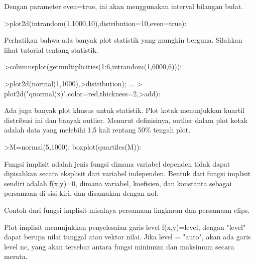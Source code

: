 \documentclass[a4paper,10pt]{article}
\begin{document}
\begin{eulernotebook}
\begin{eulercomment}
\begin{eulercomment}
\begin{eulercomment}
\begin{eulercomment}
\begin{eulercomment}
\begin{eulercomment}
\begin{eulercomment}
\begin{eulercomment}
\begin{eulerprompt}
\end{eulerprompt}
\begin{eulercomment}
Dengan parameter even=true, ini akan menggunakan interval bilangan
bulat.
\end{eulercomment}
\begin{eulerprompt}
>plot2d(intrandom(1,1000,10),distribution=10,even=true):
\end{eulerprompt}
\begin{eulercomment}
Perhatikan bahwa ada banyak plot statistik yang mungkin berguna.
Silahkan lihat tutorial tentang statistik.
\end{eulercomment}
\begin{eulerprompt}
>columnsplot(getmultiplicities(1:6,intrandom(1,6000,6))):
\end{eulerprompt}
\begin{eulerprompt}
>plot2d(normal(1,1000),>distribution); ...
>  plot2d("qnormal(x)",color=red,thickness=2,>add):
\end{eulerprompt}
\begin{eulercomment}
Ada juga banyak plot khusus untuk statistik. Plot kotak menunjukkan
kuartil distribusi ini dan banyak outlier. Menurut definisinya,
outlier dalam plot kotak adalah data yang melebihi 1,5 kali rentang
50\% tengah plot.
\end{eulercomment}
\begin{eulerprompt}
>M=normal(5,1000); boxplot(quartiles(M)):
\end{eulerprompt}
\begin{eulercomment}
Fungsi implisit adalah jenis fungsi dimana variabel dependen tidak
dapat dipisahkan secara eksplisit dari variabel independen. Bentuk
dari fungsi implisit sendiri adalah f(x,y)=0, dimana variabel,
koefisien, dan konstanta sebagai persamaan di sisi kiri, dan disamakan
dengan nol.

Contoh dari fungsi implisit misalnya persamaan lingkaran dan persamaan
elips.

Plot implisit menunjukkan penyelesaian garis level f(x,y)=level,
dengan "level" dapat berupa nilai tunggal atau vektor nilai. Jika
level = "auto", akan ada garis level nc, yang akan tersebar antara
fungsi minimum dan maksimum secara merata.


\end{eulercomment}
\end{eulercomment}
\end{eulercomment}
\end{eulercomment}
\end{eulercomment}
\end{eulercomment}
\end{eulercomment}
\end{eulercomment}
\end{eulercomment}
\end{eulernotebook}
\end{document}
